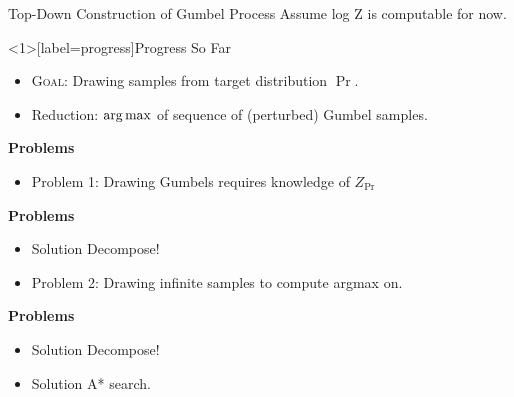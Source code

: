 \begin{frame}{Top-Down Construction of Gumbel Process}
  Assume log Z is computable for now.
\end{frame}

\begin{frame}<1>[label=progress]{Progress So Far}
  
  \begin{itemize}[<+->]
  \item \textsc{Goal}: Drawing samples from target distribution $\Pr$.
  \item Reduction: $\operatorname*{{arg\,max}}$ of sequence of (perturbed) Gumbel samples. %
  \end{itemize}
  \begin{overprint}

    \textbf{Problems}
    \begin{itemize}
    \item {\color{red}Problem 1:} Drawing Gumbels requires knowledge of $Z_{\Pr}$        %
    \end{itemize}

    \textbf{Problems}
    \begin{itemize} 
    \item {\color{blue} Solution} Decompose! %
    \item {\color{red} Problem 2:} Drawing infinite samples to compute argmax on. %
    \end{itemize}

    \textbf{Problems}
    \begin{itemize} 
    \item {\color{blue} Solution} Decompose! %
    \item {\color{blue} Solution} A* search.
    \end{itemize}
  \end{overprint}
\end{frame}

